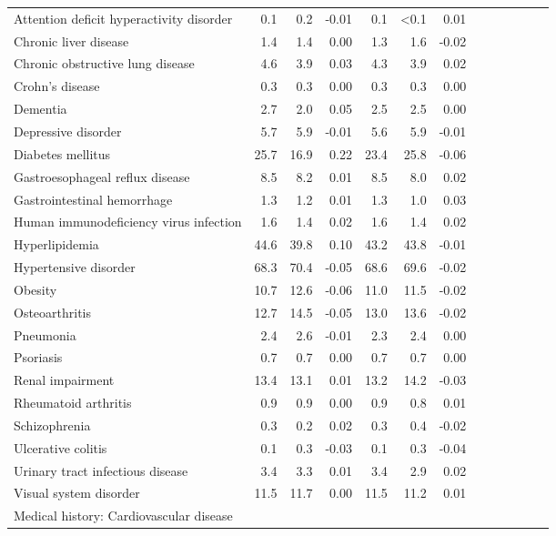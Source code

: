 \documentclass[11pt,]{article}
\begin{document}
\begin{longtable}{lrrrrrrrrrrrr}
      Attention deficit hyperactivity disorder &  0.1 &  0.2 & -0.01 &  0.1 & <0.1 &  0.01 \\ 
      Chronic liver disease &  1.4 &  1.4 &  0.00 &  1.3 &  1.6 & -0.02 \\ 
      Chronic obstructive lung disease &  4.6 &  3.9 &  0.03 &  4.3 &  3.9 &  0.02 \\ 
      Crohn's disease &  0.3 &  0.3 &  0.00 &  0.3 &  0.3 &  0.00 \\ 
      Dementia &  2.7 &  2.0 &  0.05 &  2.5 &  2.5 &  0.00 \\ 
      Depressive disorder &  5.7 &  5.9 & -0.01 &  5.6 &  5.9 & -0.01 \\ 
      Diabetes mellitus & 25.7 & 16.9 &  0.22 & 23.4 & 25.8 & -0.06 \\ 
      Gastroesophageal reflux disease &  8.5 &  8.2 &  0.01 &  8.5 &  8.0 &  0.02 \\ 
      Gastrointestinal hemorrhage &  1.3 &  1.2 &  0.01 &  1.3 &  1.0 &  0.03 \\ 
      Human immunodeficiency virus infection &  1.6 &  1.4 &  0.02 &  1.6 &  1.4 &  0.02 \\ 
      Hyperlipidemia & 44.6 & 39.8 &  0.10 & 43.2 & 43.8 & -0.01 \\ 
      Hypertensive disorder & 68.3 & 70.4 & -0.05 & 68.6 & 69.6 & -0.02 \\ 
      Obesity & 10.7 & 12.6 & -0.06 & 11.0 & 11.5 & -0.02 \\ 
      Osteoarthritis & 12.7 & 14.5 & -0.05 & 13.0 & 13.6 & -0.02 \\ 
      Pneumonia &  2.4 &  2.6 & -0.01 &  2.3 &  2.4 &  0.00 \\ 
      Psoriasis &  0.7 &  0.7 &  0.00 &  0.7 &  0.7 &  0.00 \\ 
      Renal impairment & 13.4 & 13.1 &  0.01 & 13.2 & 14.2 & -0.03 \\ 
      Rheumatoid arthritis &  0.9 &  0.9 &  0.00 &  0.9 &  0.8 &  0.01 \\ 
      Schizophrenia &  0.3 &  0.2 &  0.02 &  0.3 &  0.4 & -0.02 \\ 
      Ulcerative colitis &  0.1 &  0.3 & -0.03 &  0.1 &  0.3 & -0.04 \\ 
      Urinary tract infectious disease &  3.4 &  3.3 &  0.01 &  3.4 &  2.9 &  0.02 \\ 
      Visual system disorder & 11.5 & 11.7 &  0.00 & 11.5 & 11.2 &  0.01 \\ 
  Medical history: Cardiovascular disease &    &    &     &    &    &     \\ 

\end{longtable}
\end{document}
